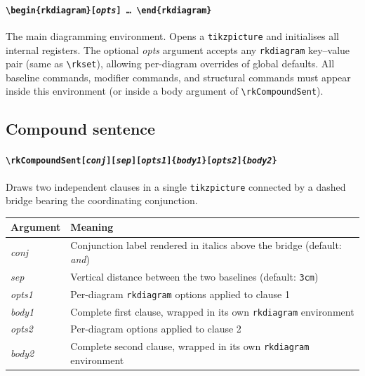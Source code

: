 \documentclass[11pt]{article}
\newcommand{\cmd}[1]{\texttt{\textbackslash #1}}
\begin{document}
\paragraph{\texttt{\textbackslash begin\{rkdiagram\}[\textit{opts}] \ldots\ \textbackslash end\{rkdiagram\}}}
The main diagramming environment.  Opens a \texttt{tikzpicture} and initialises
all internal registers.  The optional \textit{opts} argument accepts any
\texttt{rkdiagram} key--value pair (same as \cmd{rkset}), allowing per-diagram
overrides of global defaults.  All baseline commands, modifier commands, and
structural commands must appear inside this environment (or inside a body
argument of \cmd{rkCompoundSent}).

\subsection*{Compound sentence}

\paragraph{\cmd{rkCompoundSent[\textit{conj}][\textit{sep}][\textit{opts1}]\{\textit{body1}\}[\textit{opts2}]\{\textit{body2}\}}}
Draws two independent clauses in a single \texttt{tikzpicture} connected by a
dashed bridge bearing the coordinating conjunction.

\medskip
\begin{tabular}{@{}p{3.5cm}p{11.5cm}@{}}
  \toprule
  Argument & Meaning \\
  \midrule
  \textit{conj}  & Conjunction label rendered in italics above the bridge (default: \emph{and}) \\
  \textit{sep}   & Vertical distance between the two baselines (default: \texttt{3cm}) \\
  \textit{opts1} & Per-diagram \texttt{rkdiagram} options applied to clause 1 \\
  \textit{body1} & Complete first clause, wrapped in its own \texttt{rkdiagram} environment \\
  \textit{opts2} & Per-diagram options applied to clause 2 \\
  \textit{body2} & Complete second clause, wrapped in its own \texttt{rkdiagram} environment \\
  \bottomrule
\end{tabular}
\end{document}
